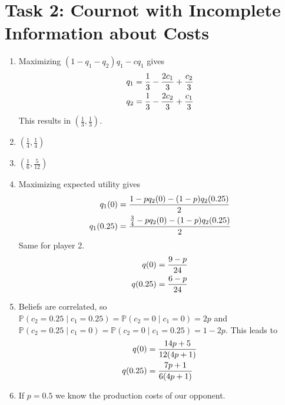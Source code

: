 \documentclass{article}
\begin{document}
	\section*{Task 2: Cournot with Incomplete Information about Costs}
	\begin{enumerate}[label=(\alph*)]
		\item Maximizing $(1-q_1-q_2)q_1 - cq_1$ gives 
		\begin{align}
			q_1 &= \frac{1}{3} - \frac{2c_1}{3} + \frac{c_2}{3} \notag \\
			q_2 &= \frac{1}{3} - \frac{2c_2}{3} + \frac{c_1}{3} \notag
		\end{align}
		This results in $\left(\frac{1}{3},\frac{1}{3}\right)$.
		\item $\left(\frac{1}{4},\frac{1}{4}\right)$
		\item $\left(\frac{1}{6},\frac{5}{12}\right)$
		\item Maximizing expected utility gives
		\begin{align}
			q_1(0) &= \frac{1-pq_2(0) - (1-p)q_2(0.25)}{2} \notag \\
			q_1(0.25) &= \frac{\frac{3}{4}-pq_2(0) - (1-p)q_2(0.25)}{2} \notag
		\end{align}
		Same for player 2.
		\begin{align}
			q(0) &= \frac{9-p}{24} \notag \\
			q(0.25) &= \frac{6-p}{24} \notag
		\end{align}
		\item Beliefs are correlated, so $\mathbb{P}(c_2 = 0.25\mid c_1 = 0.25) = \mathbb{P}(c_2 = 0\mid c_1 = 0) = 2p$ and $\mathbb{P}(c_2 = 0.25 \mid c_1 = 0) = \mathbb{P}(c_2 = 0\mid c_1 = 0.25) = 1-2p$. This leads to
		\begin{align}
			q(0) &= \frac{14p+5}{12(4p+1)}\notag \\
			q(0.25) &= \frac{7p+1}{6(4p+1)} \notag
		\end{align}
		\item If $p=0.5$ we know the production costs of our opponent.
	\end{enumerate}
\end{document}
